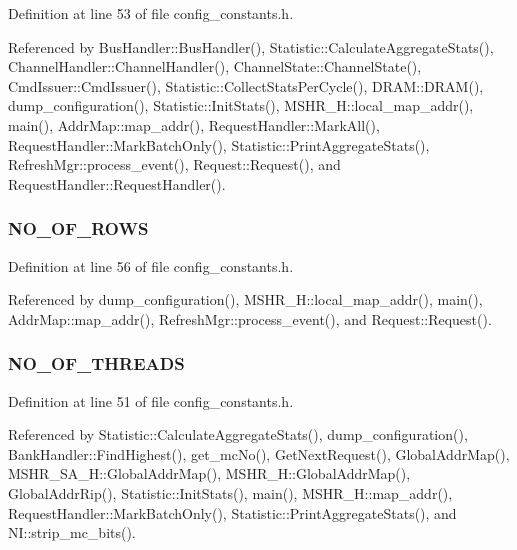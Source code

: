 Definition at line 53 of file config\_\-constants.h.

Referenced by BusHandler::BusHandler(), Statistic::CalculateAggregateStats(), ChannelHandler::ChannelHandler(), ChannelState::ChannelState(), CmdIssuer::CmdIssuer(), Statistic::CollectStatsPerCycle(), DRAM::DRAM(), dump\_\-configuration(), Statistic::InitStats(), MSHR\_\-H::local\_\-map\_\-addr(), main(), AddrMap::map\_\-addr(), RequestHandler::MarkAll(), RequestHandler::MarkBatchOnly(), Statistic::PrintAggregateStats(), RefreshMgr::process\_\-event(), Request::Request(), and RequestHandler::RequestHandler().
\subsubsection[{NO\_\-OF\_\-ROWS}]{ {\bf NO\_\-OF\_\-ROWS}}\label{mc__constants_8h_b3d6bbcaed3c5e9c84170ea78a55ac79}




Definition at line 56 of file config\_\-constants.h.

Referenced by dump\_\-configuration(), MSHR\_\-H::local\_\-map\_\-addr(), main(), AddrMap::map\_\-addr(), RefreshMgr::process\_\-event(), and Request::Request().
\subsubsection[{NO\_\-OF\_\-THREADS}]{ {\bf NO\_\-OF\_\-THREADS}}\label{mc__constants_8h_550c282169249cd6a9f0eb1b19bb8e04}




Definition at line 51 of file config\_\-constants.h.

Referenced by Statistic::CalculateAggregateStats(), dump\_\-configuration(), BankHandler::FindHighest(), get\_\-mcNo(), GetNextRequest(), GlobalAddrMap(), MSHR\_\-SA\_\-H::GlobalAddrMap(), MSHR\_\-H::GlobalAddrMap(), GlobalAddrRip(), Statistic::InitStats(), main(), MSHR\_\-H::map\_\-addr(), RequestHandler::MarkBatchOnly(), Statistic::PrintAggregateStats(), and NI::strip\_\-mc\_\-bits().
